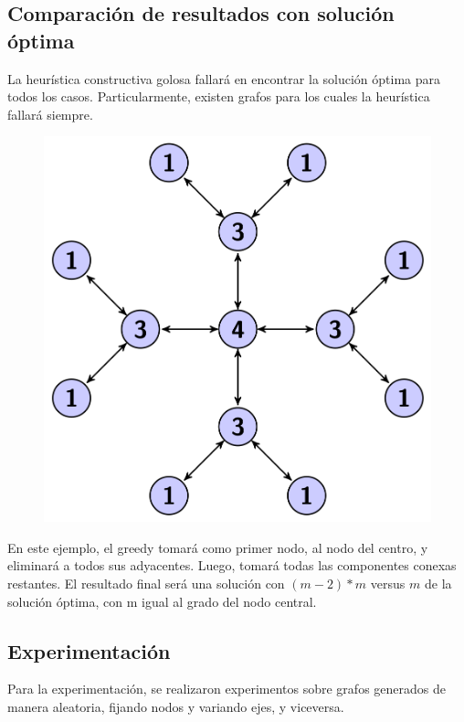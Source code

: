 \subsection{Comparaci\'on de resultados con soluci\'on \'optima}
La heurística constructiva golosa fallará en encontrar la solución óptima para todos los casos.
Particularmente, existen grafos para los cuales la heurística fallará siempre.\\
  \begin{figure}[h!]
   \begin{center}
 	\includegraphics[scale=0.4]{imagenes/maloGreedy.png}
   \end{center}
 \end{figure}

En este ejemplo, el greedy tomará como primer nodo, al nodo del centro, y eliminará a todos sus adyacentes. Luego, tomará todas las componentes conexas restantes.
El resultado final será una solución con $(m-2)*m$ versus $m$ de la solución óptima, con m igual al grado del nodo central.

\subsection{Experimentaci\'on}
Para la experimentación, se realizaron experimentos sobre grafos generados de manera aleatoria, fijando nodos y variando ejes, y viceversa.\\

